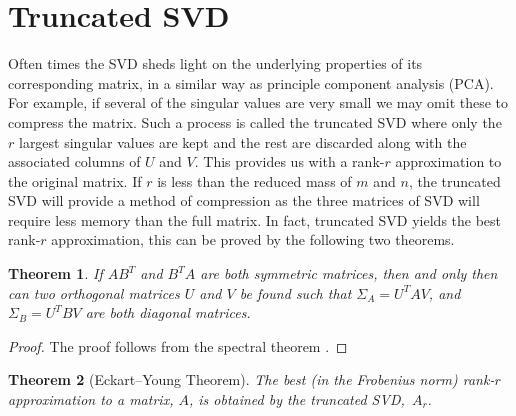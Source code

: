 \documentclass[11pt, a4paper, twocolumn]{article}
\newtheorem{theorem}{Theorem}
\begin{document}
\section{Truncated SVD}
\label{sec:trunc}
Often times the SVD sheds light on the underlying properties of its corresponding matrix, in a similar way as principle component analysis (PCA). For example, if several of the singular values are very small we may omit these to compress the matrix. Such a process is called the truncated SVD where only the $r$ largest singular values are kept and the rest are discarded along with the associated columns of $U$ and $V$. This provides us with a rank-$r$ approximation to the original matrix. If $r$ is less than the reduced mass of $m$ and $n$, the truncated SVD will provide a method of compression as the three matrices of SVD will require less memory than the full matrix. In fact, truncated SVD yields the best rank-$r$ approximation, this can be proved by the following two theorems.
\begin{theorem}
    If $AB^T$ and $B^TA$ are both symmetric matrices, then and only then can two orthogonal matrices $U$ and $V$ be found such that $\Sigma_A = U^T A V$, and $\Sigma_B = U^T B V$ are both diagonal matrices.
    \label{thm:symm}
\end{theorem}
\begin{proof}
    The proof follows from the spectral theorem \cite{axler}.
\end{proof}
\begin{theorem}[Eckart--Young Theorem]
    The best (in the Frobenius norm) rank-$r$ approximation to a matrix, $A$, is obtained by the truncated SVD,~$A_r$.
    \label{thm:frob}
\end{theorem}
\end{document}
